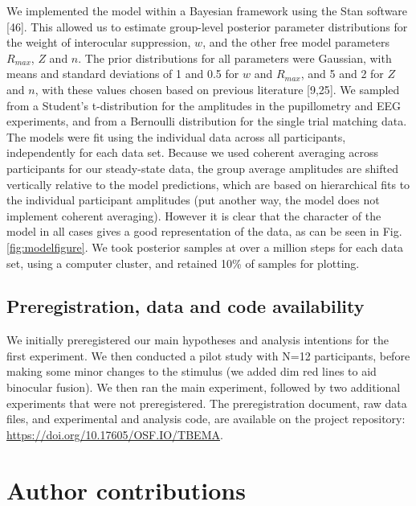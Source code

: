 \documentclass[
]{article}
\begin{document}
We implemented the model within a Bayesian framework using the Stan software {[}46{]}. This allowed us to estimate group-level posterior parameter distributions for the weight of interocular suppression, \(w\), and the other free model parameters \(R_{max}\), \(Z\) and \(n\). The prior distributions for all parameters were Gaussian, with means and standard deviations of 1 and 0.5 for \(w\) and \(R_{max}\), and 5 and 2 for \(Z\) and \(n\), with these values chosen based on previous literature {[}9,25{]}. We sampled from a Student's t-distribution for the amplitudes in the pupillometry and EEG experiments, and from a Bernoulli distribution for the single trial matching data. The models were fit using the individual data across all participants, independently for each data set. Because we used coherent averaging across participants for our steady-state data, the group average amplitudes are shifted vertically relative to the model predictions, which are based on hierarchical fits to the individual participant amplitudes (put another way, the model does not implement coherent averaging). However it is clear that the character of the model in all cases gives a good representation of the data, as can be seen in Fig. \ref{fig:modelfigure}. We took posterior samples at over a million steps for each data set, using a computer cluster, and retained 10\% of samples for plotting.

\hypertarget{preregistration-data-and-code-availability}{%
\subsection{Preregistration, data and code availability}\label{preregistration-data-and-code-availability}}

We initially preregistered our main hypotheses and analysis intentions for the first experiment. We then conducted a pilot study with N=12 participants, before making some minor changes to the stimulus (we added dim red lines to aid binocular fusion). We then ran the main experiment, followed by two additional experiments that were not preregistered. The preregistration document, raw data files, and experimental and analysis code, are available on the project repository: \url{https://doi.org/10.17605/OSF.IO/TBEMA}.

\hypertarget{author-contributions}{%
\section{Author contributions}\label{author-contributions}}
\end{document}
